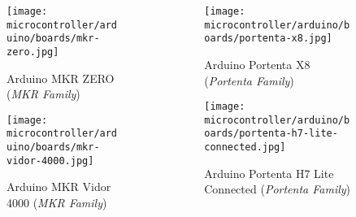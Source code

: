 \documentclass[aspectratio=169]{beamer}
\begin{document}
\begin{frame}
    \begin{columns}
        \begin{column}{0.5\textwidth}
            \begin{figure}
                \texttt{[image: microcontroller/arduino/boards/mkr-zero.jpg]}
                \caption{Arduino\textregistered{} MKR ZERO (\textit{MKR Family})}
            \end{figure}
            \begin{figure}
                \texttt{[image: microcontroller/arduino/boards/mkr-vidor-4000.jpg]}
                \caption{Arduino\textregistered{} MKR Vidor 4000 (\textit{MKR Family})}
            \end{figure}
        \end{column}
        \begin{column}{0.5\textwidth}
            \begin{figure}
                \texttt{[image: microcontroller/arduino/boards/portenta-x8.jpg]}
                \caption{Arduino\textregistered{} Portenta X8 (\textit{Portenta Family})}
            \end{figure}
            \begin{figure}
                \texttt{[image: microcontroller/arduino/boards/portenta-h7-lite-connected.jpg]}
                \caption{Arduino\textregistered{} Portenta H7 Lite Connected (\textit{Portenta Family})}
            \end{figure}
        \end{column}
    \end{columns}
\end{frame}
\end{document}
